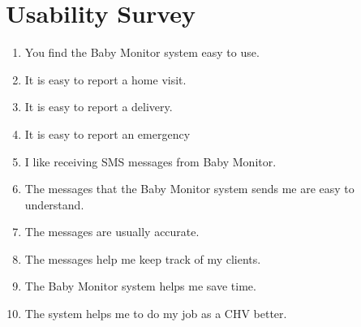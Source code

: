 \chapter{Usability Survey }

\begin{enumerate}
\item You find the Baby Monitor system easy to use.
\item It is easy to report a home visit. 
\item It is easy to report a delivery.
\item It is easy to report an emergency
\item I like receiving SMS messages from Baby Monitor. 
\item The messages that the Baby Monitor system sends me are easy to understand. 
\item The messages are usually accurate. 
\item The messages help me keep track of my clients. 
\item The Baby Monitor system helps me save time.  
\item The system helps me to do my job as a CHV better. 


\end{enumerate}
